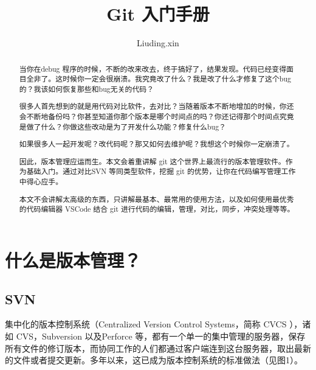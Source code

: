 \documentclass[UTF8]{ctexart}
\begin{document}
\title{Git 入门手册}
\author{Liuding.xin}
\maketitle

\begin{abstract}
    当你在debug 程序的时候，不断的改来改去，终于搞好了，结果发现。代码已经变得面目全非了。这时候你一定会很崩溃。我究竟改了什么？我是改了什么才修复了这个bug的？我该如何恢复那些和bug无关的代码？

    很多人首先想到的就是用代码对比软件，去对比？当随着版本不断地增加的时候，你还会不断地备份吗？你甚至知道你那个版本是哪个时间点的吗？你还记得那个时间点究竟是做了什么？你做这些改动是为了开发什么功能？修复什么bug？

    如果很多人一起开发呢？改代码呢？那又如何去维护呢？我想这个时候你一定崩溃了。

    因此，版本管理应运而生。本文会着重讲解 git 这个世界上最流行的版本管理软件。作为基础入门。通过对比SVN 等同类型软件，挖掘 git 的优势，让你在代码编写管理工作中得心应手。

    本文不会讲解太高级的东西，只讲解最基本、最常用的使用方法，以及如何使用最优秀的代码编辑器 VSCode 结合 git 进行代码的编辑，管理，对比，同步，冲突处理等等。

\end{abstract}

\newpage
\section{什么是版本管理？}
\subsection{SVN} %
\label{sub:SVN}

集中化的版本控制系统（Centralized Version Control Systems，简称 CVCS ），诸如 CVS，Subversion 以及Perforce 等，都有一个单一的集中管理的服务器，保存所有文件的修订版本，而协同工作的人们都通过客户端连到这台服务器，取出最新的文件或者提交更新。多年以来，这已成为版本控制系统的标准做法（见图1）。
\end{document}
